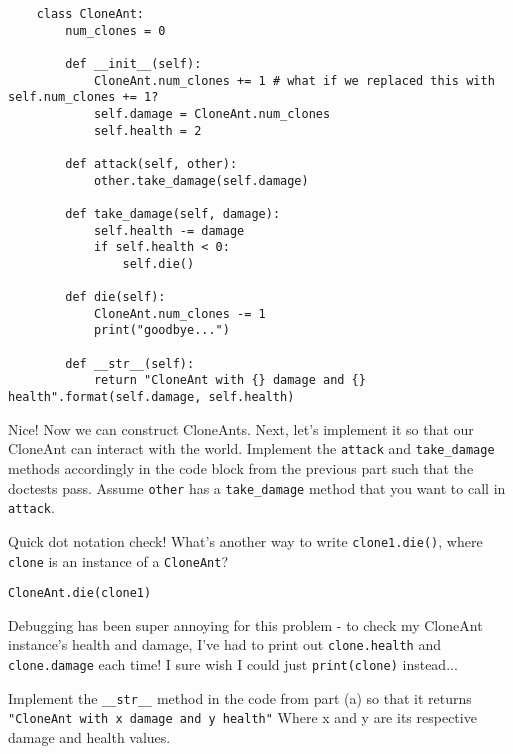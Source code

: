     \begin{solution}
    \begin{lstlisting}
    class CloneAnt:
        num_clones = 0 

        def __init__(self):
            CloneAnt.num_clones += 1 # what if we replaced this with self.num_clones += 1?
            self.damage = CloneAnt.num_clones
            self.health = 2

        def attack(self, other):
            other.take_damage(self.damage)

        def take_damage(self, damage):
            self.health -= damage
            if self.health < 0:
                self.die()

        def die(self):
            CloneAnt.num_clones -= 1
            print("goodbye...")

        def __str__(self):
            return "CloneAnt with {} damage and {} health".format(self.damage, self.health)
    \end{lstlisting}
    \end{solution}

\question Nice! Now we can construct CloneAnts. Next, let's implement it so that our CloneAnt can interact with the world. 
Implement the \texttt{attack} and \texttt{take\_damage} methods accordingly in the code block from the previous part such that the doctests pass. Assume \texttt{other} has a \texttt{take\_damage} method that you want to call in \texttt{attack}.

Quick dot notation check! What's another way to write \texttt{clone1.die()}, where \texttt{clone} is an instance of a \texttt{CloneAnt}?

\begin{solution}
\begin{lstlisting}
CloneAnt.die(clone1)
\end{lstlisting}
\end{solution}

\question Debugging has been super annoying for this problem - to check my CloneAnt instance's health and damage, I've had to print out \texttt{clone.health} and \texttt{clone.damage} each time! I sure wish I could just \texttt{print(clone)} instead...

Implement the \texttt{\_\_str\_\_} method in the code from part (a) so that it returns \texttt{"CloneAnt with x damage and y health"} Where x and y are its respective damage and health values.

